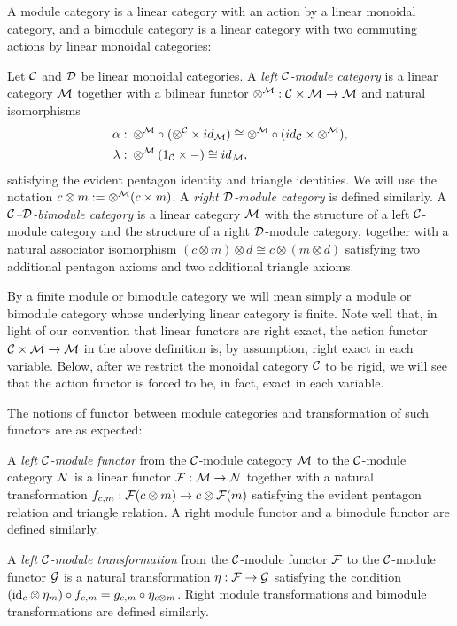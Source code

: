 \documentclass{amsart}
\begin{document}
A module category is a linear category with an action by a linear monoidal category, and a bimodule category is a linear category with two commuting actions by linear monoidal categories:
\begin{definition}
Let $\mathcal C$ and $\mathcal D$ be linear monoidal categories.
A \emph{left $\mathcal C$-module category} is a linear category $\mathcal M$ together with a bilinear functor $\otimes^{\mathcal M}: \mathcal C \times \mathcal M \to \mathcal M$ and natural isomorphisms
\begin{align*}
		\alpha: & \;    \otimes^{\mathcal M} \circ \; (\otimes^{\mathcal C} \times id_{\mathcal M}) \cong  \otimes^{\mathcal M} \circ (id_{\mathcal C} \times \otimes^{\mathcal M}), \\
		\lambda: & \; \otimes^{\mathcal M} (1_{\mathcal C} \times -) \cong id_{\mathcal M},
\end{align*}
satisfying the evident pentagon identity and triangle identities.  We will use the notation $c \otimes m := \otimes^\mathcal M(c \times m)$.  A \emph{right $\mathcal D$-module category} is defined similarly.  A \emph{$\mathcal C$--$\mathcal D$-bimodule category} is a linear category $\mathcal M$ with the structure of a left $\mathcal C$-module category and the structure of a right $\mathcal D$-module category, together with a natural associator isomorphism $(c \otimes m) \otimes d \cong c \otimes (m \otimes d)$ satisfying two additional pentagon axioms and two additional triangle axioms.  
\end{definition}
\nid By a finite module or bimodule category we will mean simply a module or bimodule category whose underlying linear category is finite.  Note well that, in light of our convention that linear functors are right exact, the action functor $\mathcal C \times \mathcal M \rightarrow \mathcal M$ in the above definition is, by assumption, right exact in each variable.  Below, after we restrict the monoidal category $\mathcal C$ to be rigid, we will see that the action functor is forced to be, in fact, exact in each variable.

The notions of functor between module categories and transformation of such functors are as expected:
\begin{definition}
A \emph{left $\mathcal C$-module functor} from the $\mathcal C$-module category $\mathcal M$ to the $\mathcal C$-module category $\mathcal N$ is a linear functor $\mathcal F: \mathcal M \rightarrow \mathcal N$ together with a natural transformation $f_{c,m}:\mathcal F(c \otimes m) \rightarrow c \otimes \mathcal F(m)$ satisfying the evident pentagon relation and triangle relation.  A right module functor and a bimodule functor are defined similarly.
\end{definition}
\begin{definition}
A \emph{left $\mathcal C$-module transformation} from the $\mathcal C$-module functor $\mathcal F$ to the $\mathcal C$-module functor $\mathcal G$ is a natural transformation $\eta: \mathcal F \rightarrow \mathcal G$ satisfying the condition $(\mathrm{id}_c \otimes \eta_m) \circ f_{c,m} = g_{c,m} \circ \eta_{c \otimes m}$.  Right module transformations and bimodule transformations are defined similarly.
\end{definition}
\end{document}
